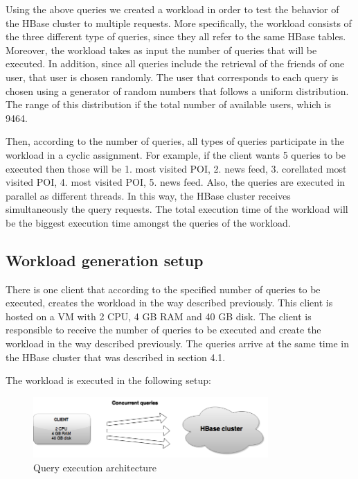 Using the above queries we created a workload in order to test the behavior of the HBase cluster to multiple requests. More specifically, the workload 
consists of the three different type of queries, since they all refer to the same HBase tables. Moreover, the workload takes as input the number of queries 
that will be executed. In addition, since all queries include the retrieval of the friends of one user, that user is chosen randomly. The user that 
corresponds to each query is chosen using a generator of random numbers that follows a uniform distribution. 
The range of this distribution if the total number of available users, which is 9464.

Then, according to the number of queries, all types of queries participate in the workload in a cyclic assignment. 
For example, if the client wants 5 queries to be executed then those will be 1. most visited POI, 2. news feed, 3. corellated most visited POI, 
4. most visited POI, 5. news feed. Also, the queries are executed in parallel as different threads. In this way, the HBase cluster 
receives simultaneously the query requests. The total execution time of the 
workload will be the biggest execution time amongst the queries of the workload. 

\subsection{Workload generation setup}

There is one client that according to the specified number of queries to be executed, creates the workload in the way described previously. This client is hosted 
on a VM with 2 CPU, 4 GB RAM and 40 GB disk. The client is responsible to receive the number of queries to be executed and create the workload in the way 
described previously. The queries arrive at the same time in the HBase cluster that was described in section 4.1.

The workload is executed in the following setup:

\begin{figure}[H]
  \centering
  \includegraphics[width=0.8\textwidth]{figures/query_ex_gray.png}
  \caption{Query execution architecture}
\end{figure}

